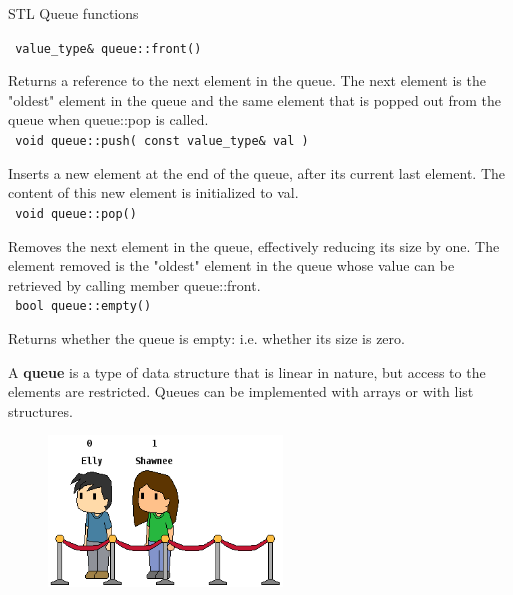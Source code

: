 \documentclass[a4paper,12pt]{book}
\begin{document}
                \begin{intro}{STL Queue functions}

                    \footnotesize
                    
                    \texttt{ value\_type\& queue::front() }

                        Returns a reference to the next element in the queue.
                        The next element is the "oldest" element in the queue and the
                        same element that is popped out from the queue when queue::pop is called. \\
                    
                    \texttt{ void queue::push( const value\_type\& val ) }

                        Inserts a new element at the end of the queue, after its current last element.
                        The content of this new element is initialized to val. \\

                    
                    \texttt{ void queue::pop() }

                        Removes the next element in the queue, effectively reducing its size by one.
                        The element removed is the "oldest" element in the queue whose value can be
                        retrieved by calling member queue::front. \\
                    
                    \texttt{ bool queue::empty() }

                        Returns whether the queue is empty: i.e. whether its size is zero. \\

                    
                \end{intro}

            
                A \textbf{ queue } is a type of data structure that
                is linear in nature, but access to the elements are
                restricted. Queues can be implemented with arrays or
                with list structures. ~\\

                
                \begin{figure}[h]
                    \centering
                    \includegraphics[height=4cm]{lab01-queue-a}
                \end{figure}
\end{document}
